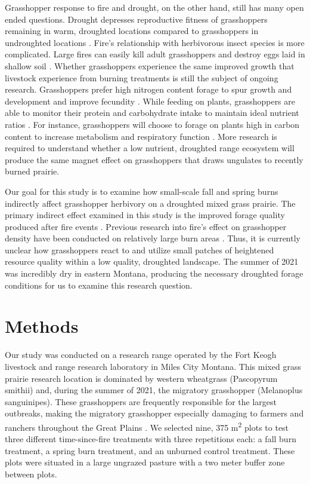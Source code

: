 \documentclass[referee, 
	            sn-basic]
           {sn-jnl}
\begin{document}
\begin{linenumbers}
Grasshopper response to fire and drought, on the other hand, still has
many open ended questions. Drought depresses reproductive fitness of
grasshoppers remaining in warm, droughted locations compared to
grasshoppers in undroughted locations \citep{rosenblatt2018}. Fire's
relationship with herbivorous insect species is more complicated. Large
fires can easily kill adult grasshoppers and destroy eggs laid in
shallow soil \citep{branson2013}. Whether grasshoppers experience the
same improved growth that livestock experience from burning treatments
is still the subject of ongoing research. Grasshoppers prefer high
nitrogen content forage to spur growth and development and improve
fecundity \citep{schmitz2010}. While feeding on plants, grasshoppers are
able to monitor their protein and carbohydrate intake to maintain ideal
nutrient ratios \citep{behmer2009, behmer2008}. For instance,
grasshoppers will choose to forage on plants high in carbon content to
increase metabolism and respiratory function \citep{schmitz2010}. More
research is required to understand whether a low nutrient, droughted
range ecosystem will produce the same magnet effect on grasshoppers that
draws ungulates to recently burned prairie.

Our goal for this study is to examine how small-scale fall and spring
burns indirectly affect grasshopper herbivory on a droughted mixed grass
prairie. The primary indirect effect examined in this study is the
improved forage quality produced after fire events \citep{allred2011}.
Previous research into fire's effect on grasshopper density have been
conducted on relatively large burn areas
\citep{branson2005, vermeire2004}. Thus, it is currently unclear how
grasshoppers react to and utilize small patches of heightened resource
quality within a low quality, droughted landscape. The summer of 2021
was incredibly dry in eastern Montana, producing the necessary droughted
forage conditions for us to examine this research question.

\hypertarget{methods}{%
\section{Methods}\label{methods}}

Our study was conducted on a research range operated by the Fort Keogh
livestock and range research laboratory in Miles City Montana. This
mixed grass prairie research location is dominated by western wheatgrass
(Pascopyrum smithii) and, during the summer of 2021, the migratory
grasshopper (Melanoplus sanguinipes). These grasshoppers are frequently
responsible for the largest outbreaks, making the migratory grasshopper
especially damaging to farmers and ranchers throughout the Great Plains
\citep{onsager2000, olfert2021}. We selected nine, 375
m\textsuperscript{2} plots to test three different time-since-fire
treatments with three repetitions each: a fall burn treatment, a spring
burn treatment, and an unburned control treatment. These plots were
situated in a large ungrazed pasture with a two meter buffer zone
between plots.


\end{linenumbers}
\end{document}
